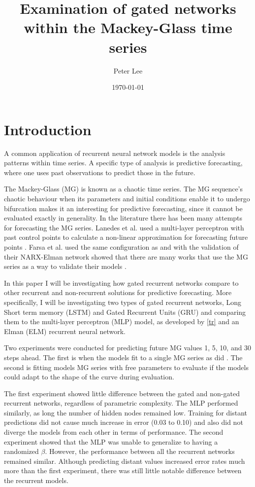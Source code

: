 \documentclass[11pt]{article}
\author{Peter Lee}
\date{\today}
\title{Examination of gated networks within the Mackey-Glass time series}
\begin{document}
\maketitle

\section{Introduction}
A common application of recurrent neural network models is the
analysis patterns within time series. A specific
type of analysis is predictive forecasting, where one uses past
observations to predict those in the future. 

The Mackey-Glass (MG) \cite{MG} is known as a chaotic time series.
The MG sequence's chaotic behaviour when its parameters and initial
conditions enable it to undergo bifurcation makes it an interesting
for predictive forecasting, since it cannot be evaluated exactly
in generality. In the literature there has been many attempts for forecasting the MG
series. Lanedes et al. used a multi-layer perceptron with past control
points to calculate a non-linear approximation for forecasting future
points \cite{tr}. Farsa et al. used the same configuration as
\cite{tr} and with the validation of their NARX-Elman network showed
that there are many works that use the MG series as a way to validate
their models \cite{Farsa}.

In this paper I will be investigating how gated recurrent networks
compare to other recurrent and non-recurrent solutions for predictive
forecasting. More specifically, I will be investigating two types of
gated recurrent networks, Long Short term memory (LSTM) \cite{LSTM}
and Gated Recurrent Units (GRU) \cite{GRU} and comparing them to the
multi-layer perceptron (MLP) model, as developed by \ref{tr} and an
Elman (ELM) recurrent neural network.

Two experiments were conducted for predicting future MG values 1, 5,
10, and 30 steps ahead. The first is when the models fit to a single
MG series as did \cite{tr,Farsa}. The second is fitting models MG series with
free parameters to evaluate if the models could adapt to the shape of
the curve during evaluation. 

The first experiment showed little difference between the gated and
non-gated recurrent networks, regardless of parametric complexity. The
MLP performed similarly, as long the number of hidden nodes
remained low. Training for distant predictions did not cause much
increase in error (0.03 to 0.10) and also did not diverge the
models from each other in terms of performance. The second experiment showed that the MLP was unable to generalize to
having a randomized $\beta$. However, the performance between all the
recurrent networks remained similar. Although predicting distant
values increased error rates much more than the first experiment,
there was still little notable difference between the recurrent
models.
\end{document}
